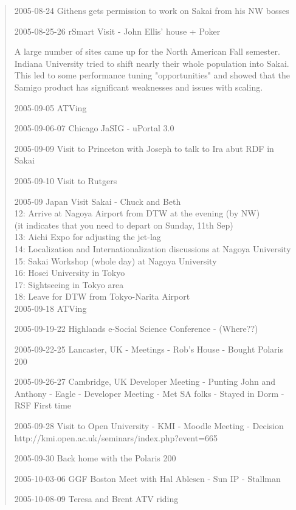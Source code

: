 \begin{quote}
2005-08-24 Githens gets permission to work on Sakai from his NW bosses

2005-08-25-26 rSmart Visit - John Ellis' house + Poker

A large number of sites came up for the North American Fall semester.  Indiana University tried to shift nearly their whole population into Sakai.   This led to some performance tuning "opportunities" and showed that the Samigo product has significant weaknesses and issues with scaling.  

2005-09-05 ATVing

2005-09-06-07 Chicago JaSIG - uPortal 3.0

2005-09-09 Visit to Princeton with Joseph to talk to Ira abut RDF in Sakai

2005-09-10 Visit to Rutgers

2005-09 Japan Visit Sakai - Chuck and Beth\\
    12: Arrive at Nagoya Airport from DTW at the evening (by NW)\\
       (it indicates that you need to depart on Sunday, 11th Sep)\\
    13: Aichi Expo for adjusting the jet-lag\\
    14: Localization and Internationalization discussions at Nagoya University\\
    15: Sakai Workshop (whole day) at Nagoya University\\
    16: Hosei University in Tokyo\\
    17: Sightseeing in Tokyo area\\
    18: Leave for DTW from Tokyo-Narita Airport\\

2005-09-18 ATVing

2005-09-19-22 Highlands e-Social Science Conference - (Where??)

2005-09-22-25 Lancaster, UK - Meetings - Rob's House - Bought Polaris 200

2005-09-26-27 Cambridge, UK Developer Meeting - 
Punting John and Anthony - Eagle - Developer Meeting - 
Met SA folks - Stayed in Dorm - RSF First time

2005-09-28 Visit to Open University - KMI - Moodle Meeting - Decision
http://kmi.open.ac.uk/seminars/index.php?event=665

2005-09-30 Back home with the Polaris 200

2005-10-03-06 GGF Boston Meet with Hal Ablesen - 
Sun IP - Stallman

2005-10-08-09 Teresa and Brent ATV riding


\end{quote}
